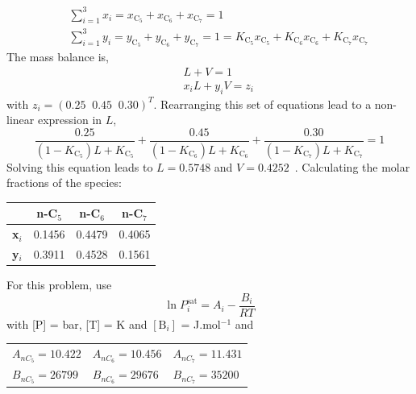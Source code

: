 \documentclass[calculator,steamtables,allquestions,datasheet]{exam_newMarcus2}
\newcommand{\frc}{\displaystyle\frac}
\begin{document}
\begin{question}
\begin{enumerate}[(a)]
{\begin{eqnarray}
&& \sum\limits_{i=1}^{3}x_{i} = x_{\text{C}_{5}} + x_{\text{C}_{6}} + x_{\text{C}_{7}} = 1  \nonumber \\
&& \sum\limits_{i=1}^{3}y_{i} = y_{\text{C}_{5}} + y_{\text{C}_{6}} + y_{\text{C}_{7}} = 1  = K_{\text{C}_{5}}x_{\text{C}_{5}} + K_{\text{C}_{6}}x_{\text{C}_{6}} + K_{\text{C}_{7}}x_{\text{C}_{7}} \nonumber
\end{eqnarray}
The mass balance is,~
\begin{eqnarray}
&& L + V = 1 \nonumber \\
&& x_{i}L + y_{i}V = z_{i} \nonumber 
\end{eqnarray}
with $z_{i}=\left(0.25\;\;0.45\;\;0.30\right)^{T}$. Rearranging this set of equations lead to a non-linear expression in $L$,~
\begin{displaymath}
\frc{0.25}{\left(1-K_{\text{C}_{5}}\right)L+K_{\text{C}_{5}}} + \frc{0.45}{\left(1-K_{\text{C}_{6}}\right)L+K_{\text{C}_{6}}} +  \frc{0.30}{\left(1-K_{\text{C}_{7}}\right)L+K_{\text{C}_{7}}} = 1 
\end{displaymath}
Solving this equation leads to $L=0.5748$ and $V=0.4252$~. Calculating the molar fractions of the species:~
\begin{center}
\begin{tabular}{c c c c}
\hline
                 & {\bf n-C$_{5}$} &  {\bf n-C$_{6}$} &  {\bf n-C$_{7}$} \\
\hline
  {\bf x$_{i}$}   & 0.1456         &  0.4479         & 0.4065    \\
  {\bf y$_{i}$}   &  0.3911        &  0.4528         & 0.1561    \\
\hline
\end{tabular} 
\end{center}}

%
\end{enumerate}

For this problem, use 
\begin{displaymath}
   \ln P_{i}^{\text{sat}} = A_{i} - \frc{B_{i}}{RT}
\end{displaymath} 
with [P] = bar, [T] = K and $\left[\text{B}_{i}\right]$ = J.mol$^{-1}$ and
    \begin{center}
       \begin{tabular}{l l l} 
          $A_{nC_{5}}=10.422$ & $A_{nC_{6}}=10.456$ & $A_{nC_{7}}=11.431$ \\
          $B_{nC_{5}}=26799$  & $B_{nC_{6}}=29676$  & $B_{nC_{7}}=35200$  
       \end{tabular}
    \end{center}
%
\end{question}
\end{document}
